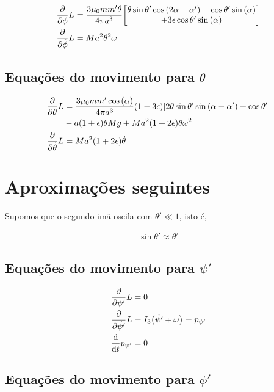 \documentclass[a4paper, 12pt]{article}
\begin{document}
\begin{align}
    \pdv{}{\phi}L&=\frac{3\mu_0mm'\theta}{4\pi a^3}\mqty[\theta\sin\theta'\cos\qty(2\alpha-\alpha')-\cos\theta'\sin\qty(\alpha)\\
    +3\epsilon\cos\theta'\sin\qty(\alpha)]\nonumber\\
    \pdv{}{\dot{\phi}}L&=Ma^2\theta^2\omega\nonumber
\end{align}

\subsection{Equações do movimento para $\theta$}

\begin{align}
    \pdv{}{\theta}L&=\frac{3\mu_0mm'\cos\qty(\alpha)}{4\pi a^3}\qty(1-3\epsilon)\qty[2\theta\sin\theta'\sin\qty(\alpha-\alpha')+\cos\theta']\nonumber\\
    &-a\qty(1+\epsilon)\theta Mg+Ma^2\qty(1+2\epsilon)\theta\omega^2\nonumber\\
    \pdv{}{\dot{\theta}}L&=Ma^2\qty(1+2\epsilon)\dot{\theta}\nonumber
\end{align}

\section{Aproximações seguintes}

Supomos que o segundo imã oscila com $\theta' \ll 1$, isto é,

\begin{align}
    \sin\theta'\approx\theta'
\end{align}

\subsection{Equações do movimento para $\psi'$}

\begin{align}
    \pdv{}{\psi'}L&=0\nonumber\\
    \pdv{}{\dot{\psi'}}L&=I_3\qty(\dot{\psi'}+\omega)=p_{\psi'}\nonumber\\
    \dv{}{t}p_{\psi'}&=0
\end{align}

\subsection{Equações do movimento para $\phi'$}
\end{document}
